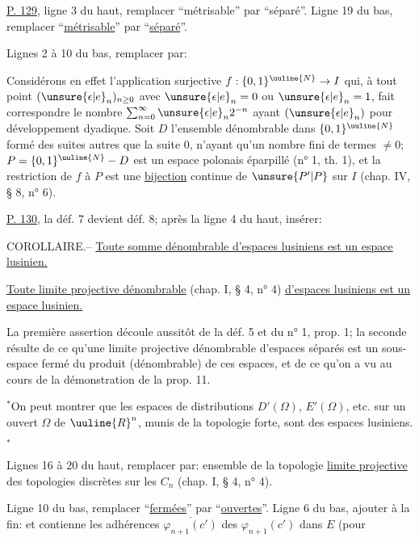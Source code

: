 \uline{P. 129}, ligne 3 du haut, remplacer ``métrisable'' par ``séparé''. Ligne 19 du bas, remplacer ``\uline{métrisable}'' par ``\uline{séparé}''.

Lignes 2 à 10 du bas, remplacer par:

Considérons en effet l'application surjective $f:\{0,1\}^{\uuline{N}}\to I$ qui, à tout point $(\unsure{\epsilon|e}_n)_{n\ge0}$ avec $\unsure{\epsilon|e}_n=0$ ou $\unsure{\epsilon|e}_n=1$, fait correspondre le nombre $\sum_{n=0}^{\infty}\unsure{\epsilon|e}_n2^{-n}$ ayant $(\unsure{\epsilon|e}_n)$ pour développement dyadique. Soit $D$ l'ensemble dénombrable dans $\{0,1\}^{\uuline{N}}$ formé des suites autres que la suite $0$, n'ayant qu'un nombre fini de termes $\ne0$; $P=\{0,1\}^{\uuline{N}}-D$ est un espace polonais éparpillé (n° 1, th. 1), et la restriction de $f$ à $P$ est une \uline{bijection} continue de $\unsure{P'|P}$ sur $I$ (chap. IV, § 8, n° 6).

\uline{P. 130}, la déf. 7 devient déf. 8; après la ligne 4 du haut, insérer:

COROLLAIRE.-- \uline{Toute somme dénombrable d'espaces lusiniens est un espace lusinien.}

\uline{Toute limite projective dénombrable} (chap. I, § 4, n° 4) \uline{d'espaces lusiniens est un espace lusinien.}

La première assertion découle aussitôt de la déf. 5 et du n° 1, prop. 1; la seconde résulte de ce qu'une limite projective dénombrable d'espaces séparés est un sous-espace fermé du produit (dénombrable) de ces espaces, et de ce qu'on a vu au cours de la démonstration de la prop. 11.

${}^*$On peut montrer que les espaces de distributions $D'(\Omega)$, $E'(\Omega)$, etc. sur un ouvert $\Omega$ de $\uuline{R}^{n}$, munis de la topologie forte, sont des espaces lusiniens.${}_*$

Lignes 16 à 20 du haut, remplacer par: ensemble de la topologie \uline{limite projective} des topologies discrètes sur les $C_n$ (chap. I, § 4, n° 4).

Ligne 10 du bas, remplacer ``\uline{fermées}'' par ``\uline{ouvertes}''. Ligne 6 du bas, ajouter à la fin: et contienne les adhérences $\overline{\varphi_{n+1}(c')}$ des $\varphi_{n+1}(c')$ dans $E$ (pour

